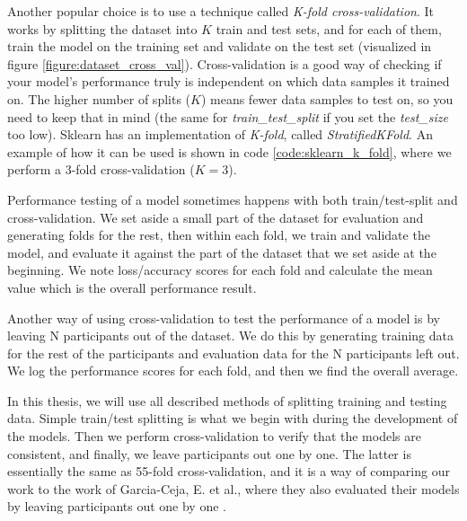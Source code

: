 Another popular choice is to use a technique called \textit{K-fold cross-validation}. It works by splitting the dataset into $K$ train and test sets, and for each of them, train the model on the training set and validate on the test set (visualized in figure \ref{figure:dataset_cross_val}). Cross-validation is a good way of checking if your model's performance truly is independent on which data samples it trained on. The higher number of splits ($K$) means fewer data samples to test on, so you need to keep that in mind (the same for \textit{train\_test\_split} if you set the \textit{test\_size} too low). Sklearn has an implementation of \textit{K-fold}, called \textit{StratifiedKFold}. An example of how it can be used is shown in code \ref{code:sklearn_k_fold}, where we perform a 3-fold cross-validation ($K = 3$). 

Performance testing of a model sometimes happens with both train/test-split and cross-validation. We set aside a small part of the dataset for evaluation and generating folds for the rest, then within each fold, we train and validate the model, and evaluate it against the part of the dataset that we set aside at the beginning. We note loss/accuracy scores for each fold and calculate the mean value which is the overall performance result.

Another way of using cross-validation to test the performance of a model is by leaving N participants out of the dataset. We do this by generating training data for the rest of the participants and evaluation data for the N participants left out. We log the performance scores for each fold, and then we find the overall average. 

In this thesis, we will use all described methods of splitting training and testing data. Simple train/test splitting is what we begin with during the development of the models. Then we perform cross-validation to verify that the models are consistent, and finally, we leave participants out one by one. The latter is essentially the same as 55-fold cross-validation, and it is a way of comparing our work to the work of Garcia-Ceja, E. et al., where they also evaluated their models by leaving participants out one by one \cite{GarciaCeja2018_classification_bipolar}. 
